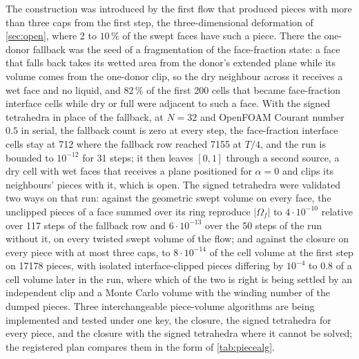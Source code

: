 \documentclass[preprint,12pt]{elsarticle}
\begin{document}
The construction was introduced by the first flow that produced pieces with more than three caps from the first step, the three-dimensional deformation of \cref{sec:open}, where 2 to $10\,\%$ of the swept faces have such a piece. There the one-donor fallback was the seed of a fragmentation of the face-fraction state: a face that falls back takes its wetted area from the donor's extended plane while its volume comes from the one-donor clip, so the dry neighbour across it receives a wet face and no liquid, and $82\,\%$ of the first 200 cells that became face-fraction interface cells while dry or full were adjacent to such a face. With the signed tetrahedra in place of the fallback, at $N = 32$ and OpenFOAM Courant number $0.5$ in serial, the fallback count is zero at every step, the face-fraction interface cells stay at 712 where the fallback row reached 7155 at $T/4$, and the run is bounded to $10^{-12}$ for 31 steps; it then leaves $[0, 1]$ through a second source, a dry cell with wet faces that receives a plane positioned for $\alpha = 0$ and clips its neighbours' pieces with it, which is open. The signed tetrahedra were validated two ways on that run: against the geometric swept volume on every face, the unclipped pieces of a face summed over its ring reproduce $|\Omega_f|$ to $4\cdot10^{-10}$ relative over 117 steps of the fallback row and $6\cdot10^{-13}$ over the 50 steps of the run without it, on every twisted swept volume of the flow; and against the closure on every piece with at most three caps, to $8\cdot10^{-14}$ of the cell volume at the first step on 17178 pieces, with isolated interface-clipped pieces differing by $10^{-4}$ to $0.8$ of a cell volume later in the run, where which of the two is right is being settled by an independent clip and a Monte Carlo volume with the winding number of the dumped pieces. Three interchangeable piece-volume algorithms are being implemented and tested under one key, the closure, the signed tetrahedra for every piece, and the closure with the signed tetrahedra where it cannot be solved; the registered plan compares them in the form of \cref{tab:piecealg}.
\end{document}

